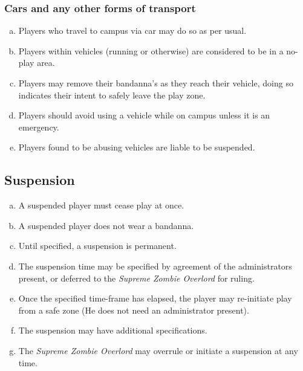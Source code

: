 \documentclass[a4paper,12pt]{article}
\begin{document}
\subsubsection{Cars and any other forms of transport}
\begin{enumerate}[(a)]
    \item Players who travel to campus via car may do so as per usual.
    \item Players within vehicles (running or otherwise) are considered to be in a no-play area.
    \item Players may remove their bandanna's as they reach their vehicle, doing so indicates their intent to safely leave the play zone.
    \item Players should avoid using a vehicle while on campus unless it is an emergency.
    \item Players found to be abusing vehicles are liable to be suspended.
\end{enumerate}

\subsection{Suspension}

\begin{enumerate}[(a)]
    \item A suspended player must cease play at once.
    \item A suspended player does not wear a bandanna.
    \item Until specified, a suspension is permanent.
    \item The suspension time may be specified by agreement of the administrators present, or deferred to the \emph{Supreme Zombie Overlord} for ruling.
    \item Once the specified time-frame has elapsed, the player may re-initiate play from a safe zone (He does not need an administrator present).
    \item The suspension may have additional specifications.
    \item The \emph{Supreme Zombie Overlord} may overrule or initiate a suspension at any time. 
\end{enumerate}
\end{document}
